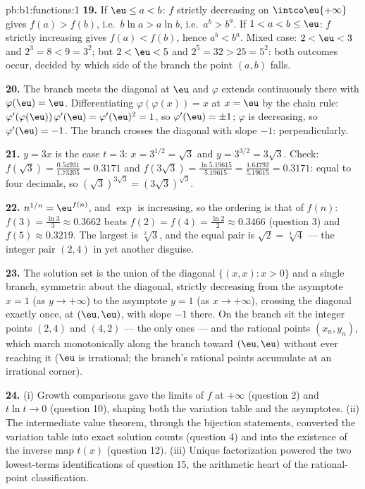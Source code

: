 \begin{solution}{pb:b1:functions:1}
\textbf{19.} If $\eu \leq a < b$: $f$ strictly decreasing on
$\intco\eu{+\infty}$ gives $f(a) > f(b)$, i.e.\ $b\ln a > a\ln
b$, i.e.\ $a^b > b^a$. If $1 < a < b \leq \eu$: $f$ strictly
increasing gives $f(a) < f(b)$, hence $a^b < b^a$. Mixed case:
$2 < \eu < 3$ and $2^3 = 8 < 9 = 3^2$; but $2 < \eu < 5$ and
$2^5 = 32 > 25 = 5^2$: both outcomes occur, decided by which side
of the branch the point $(a, b)$ falls.

\textbf{20.} The branch meets the diagonal at $\eu$ and $\varphi$
extends continuously there with $\varphi(\eu) = \eu$.
Differentiating $\varphi(\varphi(x)) = x$ at $x = \eu$ by the
chain rule: $\varphi'(\varphi(\eu))\,\varphi'(\eu) =
\varphi'(\eu)^2 = 1$, so $\varphi'(\eu) = \pm1$; $\varphi$ is
decreasing, so $\varphi'(\eu) = -1$. The branch crosses the
diagonal with slope $-1$: perpendicularly.

\textbf{21.} $y = 3x$ is the case $t = 3$: $x = 3^{1/2} = \sqrt3$
and $y = 3^{3/2} = 3\sqrt3$. Check: $f(\sqrt3) =
\frac{0.54931}{1.73205} = 0.3171$ and $f(3\sqrt3) =
\frac{\ln 5.19615}{5.19615} = \frac{1.64792}{5.19615} = 0.3171$:
equal to four decimals, so $(\sqrt3)^{3\sqrt3} =
(3\sqrt3)^{\sqrt3}$.

\textbf{22.} $n^{1/n} = \eu^{f(n)}$, and $\exp$ is increasing, so
the ordering is that of $f(n)$: $f(3) = \frac{\ln3}3 \approx
0.3662$ beats $f(2) = f(4) = \frac{\ln2}2 \approx 0.3466$ (question
3) and $f(5) \approx 0.3219$. The largest is $\sqrt[3]3$, and the
equal pair is $\sqrt2 = \sqrt[4]4$ --- the integer pair $(2, 4)$
in yet another disguise.

\textbf{23.} The solution set is the union of the diagonal $\{(x,
x) : x > 0\}$ and a single branch, symmetric about the diagonal,
strictly decreasing from the asymptote $x = 1$ (as $y \to
+\infty$) to the asymptote $y = 1$ (as $x \to +\infty$), crossing
the diagonal exactly once, at $(\eu, \eu)$, with slope $-1$
there. On the branch sit the integer points $(2, 4)$ and $(4, 2)$
--- the only ones --- and the rational points $(x_n, y_n)$,
which march monotonically along the branch toward $(\eu, \eu)$
without ever reaching it ($\eu$ is irrational; the branch's
rational points accumulate at an irrational corner).

\textbf{24.} (i) Growth comparisons gave the limits of $f$ at
$+\infty$ (question 2) and $t\ln t \to 0$ (question 10),
shaping both the variation table and the asymptotes. (ii) The
intermediate value theorem, through the bijection statements,
converted the variation table into exact solution counts
(question 4) and into the existence of the inverse map $t(x)$
(question 12). (iii) Unique factorization powered the two
lowest-terms identifications of question 15, the arithmetic heart
of the rational-point classification.


\end{solution}
